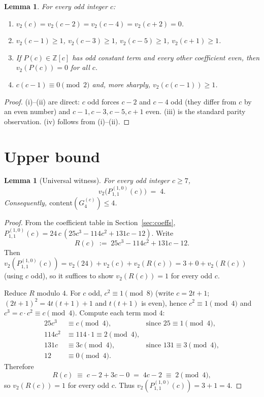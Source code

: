 \documentclass[11pt]{article}
\newtheorem{lemma}[theorem]{Lemma}
\begin{document}
\begin{lemma}\label{lem:parity}
For every odd integer $c$:
\begin{enumerate}
\item[(i)]  $v_2(c) = v_2(c-2) = v_2(c-4) = v_2(c+2) = 0$.
\item[(ii)] $v_2(c-1) \ge 1$, $v_2(c-3) \ge 1$, $v_2(c-5) \ge 1$, $v_2(c+1) \ge 1$.
\item[(iii)] If $P(c) \in \mathbb{Z}[c]$ has odd constant term and every other
             coefficient even, then $v_2(P(c)) = 0$ for all $c$.
\item[(iv)] $c(c-1) \equiv 0 \pmod 2$ and, more sharply, $v_2(c(c-1)) \ge 1$.
\end{enumerate}
\end{lemma}

\begin{proof}
(i)--(ii) are direct: $c$ odd forces $c-2$ and $c-4$ odd (they differ from
$c$ by an even number) and $c-1, c-3, c-5, c+1$ even. (iii) is the standard
parity observation. (iv) follows from (i)--(ii).
\end{proof}

\section{Upper bound}\label{sec:upper}

\begin{lemma}[Universal witness]\label{lem:upper}
For every odd integer $c \ge 7$,
\[
  v_2\bigl(P^{(1,0)}_{1,1}(c)\bigr) \;=\; 4.
\]
Consequently, $\mathrm{content}(G_4^{(c)}) \le 4$.
\end{lemma}

\begin{proof}
From the coefficient table in Section~\ref{sec:coeffs},
$P^{(1,0)}_{1,1}(c) = 24\,c\,(25c^3 - 114c^2 + 131c - 12)$. Write
\[
  R(c) \;:=\; 25c^3 - 114c^2 + 131c - 12.
\]
Then $v_2(P^{(1,0)}_{1,1}(c)) = v_2(24) + v_2(c) + v_2(R(c)) = 3 + 0 + v_2(R(c))$
(using $c$ odd), so it suffices to show $v_2(R(c)) = 1$ for every odd $c$.

Reduce $R$ modulo $4$. For $c$ odd, $c^2 \equiv 1 \pmod 8$ (write $c = 2t+1$;
$(2t+1)^2 = 4t(t+1) + 1$ and $t(t+1)$ is even), hence $c^2 \equiv 1 \pmod 4$
and $c^3 = c \cdot c^2 \equiv c \pmod 4$. Compute each term mod $4$:
\begin{align*}
25 c^3 &\equiv c \pmod 4, & \text{since } 25 \equiv 1 \pmod 4, \\
114 c^2 &\equiv 114 \cdot 1 \equiv 2 \pmod 4, \\
131 c &\equiv 3c \pmod 4, & \text{since } 131 \equiv 3 \pmod 4, \\
12 &\equiv 0 \pmod 4.
\end{align*}
Therefore
\[
  R(c) \;\equiv\; c - 2 + 3c - 0 \;=\; 4c - 2 \;\equiv\; 2 \pmod 4,
\]
so $v_2(R(c)) = 1$ for every odd $c$. Thus $v_2(P^{(1,0)}_{1,1}(c)) = 3 + 1 = 4$.
\end{proof}
\end{document}
